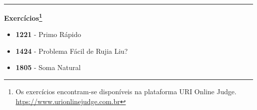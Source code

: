 \rule{\textwidth}{0.4pt}
\large{\textbf{Exercícios\footnote{Os exercícios encontram-se disponíveis na plataforma URI Online Judge. \url{htps://www.urionlinejudge.com.br}}}}\\

\begin{itemize}
    \item \textbf{1221} - Primo Rápido
    \item \textbf{1424} - Problema Fácil de Rujia Liu?
    \item \textbf{1805} - Soma Natural
\end{itemize}

\newpage